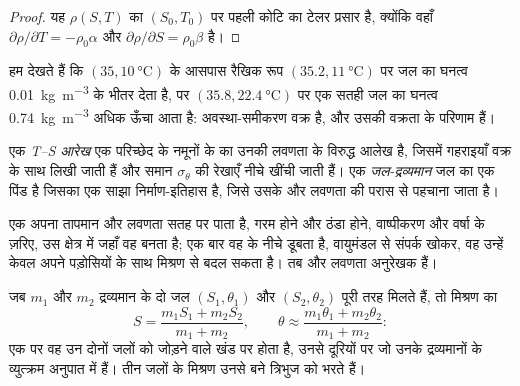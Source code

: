 \begin{proof}
यह $\rho(S, T)$ का $(S_0, T_0)$ पर पहली कोटि का टेलर प्रसार है, क्योंकि वहाँ $\partial\rho/\partial T = -\rho_0\alpha$ और $\partial\rho/\partial S =
\rho_0\beta$ है।
\end{proof}

हम देखते हैं कि $(35, \qty{10}{\celsius})$ के आसपास रैखिक रूप $(35.2, \qty{11}{\celsius})$ पर जल का घनत्व \qty{0.01}{kg.m^{-3}} के भीतर देता है, पर $(35.8, \qty{22.4}{\celsius})$ पर एक सतही जल का घनत्व \qty{0.74}{kg.m^{-3}} अधिक ऊँचा आता है: अवस्था-समीकरण वक्र है, और उसकी वक्रता के परिणाम हैं।

\begin{definition}[T–S आरेख; जल-द्रव्यमान]\label{def:b1:fluid-envelopes-structure:ts-diagram}
एक \emph{T–S आरेख} एक परिच्छेद के नमूनों के  का उनकी लवणता के विरुद्ध आलेख है, जिसमें गहराइयाँ वक्र के साथ लिखी जाती हैं और समान $\sigma_\theta$ की रेखाएँ नीचे खींची जाती हैं। एक \emph{जल-द्रव्यमान} जल का एक पिंड है जिसका एक साझा निर्माण-इतिहास है, जिसे उसके  और लवणता की परास से पहचाना जाता है।
\end{definition}

एक  अपना तापमान और लवणता सतह पर पाता है, गरम होने और ठंडा होने, वाष्पीकरण और वर्षा के ज़रिए, उस क्षेत्र में जहाँ वह बनता है; एक बार वह  के नीचे डूबता है, वायुमंडल से संपर्क खोकर, वह उन्हें केवल अपने पड़ोसियों के साथ मिश्रण से बदल सकता है। तब  और लवणता अनुरेखक हैं।

\begin{proposition}[मिश्रण-रेखाएँ सीधी हैं]\label{prop:b1:fluid-envelopes-structure:mixing}
जब $m_1$ और $m_2$ द्रव्यमान के दो जल $(S_1, \theta_1)$ और $(S_2, \theta_2)$ पूरी तरह मिलते हैं, तो मिश्रण का
\[
  S = \frac{m_1 S_1 + m_2 S_2}{m_1 + m_2},\qquad
  \theta \approx \frac{m_1 \theta_1 + m_2 \theta_2}{m_1 + m_2}:
\]
एक  पर वह उन दोनों जलों को जोड़ने वाले खंड पर होता है, उनसे दूरियों पर जो उनके द्रव्यमानों के व्युत्क्रम अनुपात में हैं। तीन जलों के मिश्रण उनसे बने त्रिभुज को भरते हैं।
\end{proposition}

